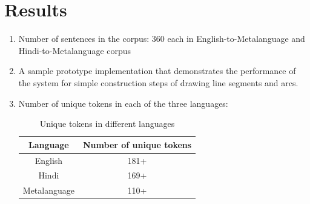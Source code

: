 \def\DevnagVersion{2.15}\documentclass[12pt]{article}
\begin{document}
\section{Results}
\begin{enumerate}
\item Number of sentences in the corpus: 360 each in English-to-Metalanguage and Hindi-to-Metalanguage corpus 
\item A sample prototype implementation that demonstrates the performance of the system for simple construction steps of drawing line segments and arcs.
\item Number of unique tokens in each of the three languages:\\
\begin{table}[h]
\smallskip
\begin{center}
\begin{tabular}{cc}
\hline
\bf{Language} & \bf{Number of unique tokens}\\[0.2cm]\hline
English & 181+\\
Hindi & 169+\\
Metalanguage & 110+\\
\hline
\end{tabular}
\caption{Unique tokens in different languages}
\end{center}
\end{table}
\end{enumerate}
\end{document}
